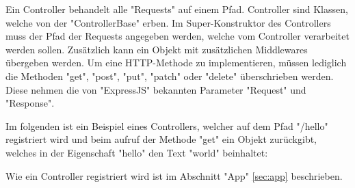 \label{sec:controller}

Ein Controller behandelt alle "Requests" auf einem Pfad. 
Controller sind Klassen, welche von der "ControllerBase" erben. Im Super-Konstruktor des Controllers muss der Pfad der Requests angegeben werden, welche vom Controller verarbeitet werden sollen. Zusätzlich kann ein Objekt mit zusätzlichen Middlewares übergeben werden. Um eine HTTP-Methode zu implementieren, müssen lediglich die Methoden "get", "post", "put", "patch" oder "delete" überschrieben werden. Diese nehmen die von "ExpressJS" bekannten Parameter "Request" und "Response". 

Im folgenden ist ein Beispiel eines Controllers, welcher auf dem Pfad "/hello" registriert wird und beim aufruf der Methode "get" ein Objekt zurückgibt, welches in der Eigenschaft "hello" den Text "world" beinhaltet:


Wie ein Controller registriert wird ist im Abschnitt "App" \ref{sec:app} beschrieben. 